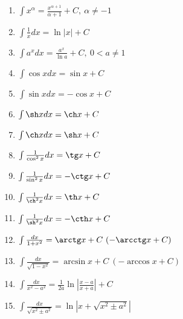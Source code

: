 \begin{multicols}{2}
\begin{enumerate}
  \item $\int x^{\alpha} = \frac{x^{\alpha+1}}{\alpha +1} + C, \ \alpha \neq -1$
  \item $\int \frac{1}{x}dx = \ln |x| + C$
  \item $\int a^{x} dx = \frac{a^x}{\ln a} + C, \ 0<a\neq 1$
  \item $\int \cos x dx = \sin x + C$
  \item $\int \sin x dx = -\cos x + C$
  \item $\int \sh x dx = \ch x + C$
  \item $\int \ch x dx = \sh x + C$
  \item $\int \frac{1}{\cos^2x} dx = \tg x + C$
  \item $\int \frac{1}{\sin^2x} dx = -\ctg x + C$
  \item $\int \frac{1}{\ch^2x} dx = \th x + C$
  \item $\int \frac{1}{\sh^2x} dx = -\cth x + C$
  \item $\int \frac{dx}{1+x^2} = \arctg x + C \ (- \arcctg x + C)$
  \item $\int \frac{dx}{\sqrt{1-x^2}} = \arcsin x + C \ (- \arccos x + C)$
  \item $\int \frac{dx}{x^2-a^2} = \frac{1}{2a} \ln \left| \frac{x-a}{x+a} \right| + C $
  \item $\int \frac{dx}{\sqrt{x^2 \pm a^2}} = \ln \left| x + \sqrt{x^2 \pm a^2} \right|$

\end{enumerate}
\end{multicols}


